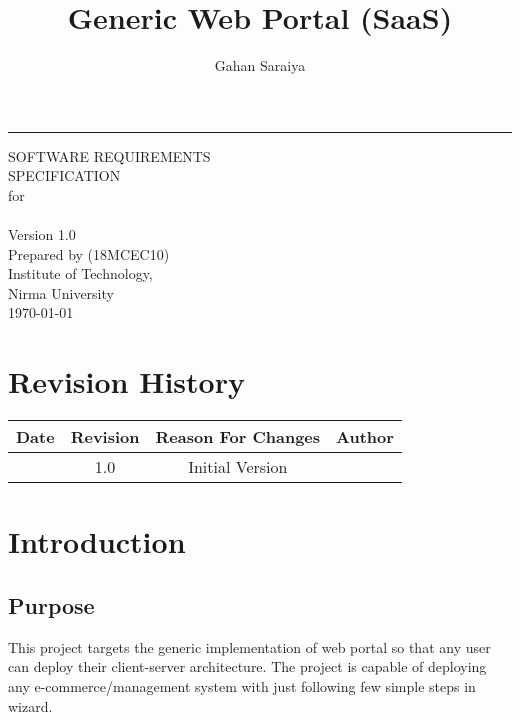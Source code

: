 \documentclass{report}
\date{}
\title{Generic Web Portal (SaaS)}
\author{Gahan Saraiya}
\def\myversion{1.0 }
\def\university{Institute of Technology, \\Nirma University}
\begin{document}
\begin{flushright}
    \rule{16cm}{5pt}\vskip1cm
    \begin{bfseries}
        \Huge{SOFTWARE REQUIREMENTS\\ SPECIFICATION}\\
        for\\
        \vspace{1.9cm}
        \thetitle\\
        \vspace{1.9cm}
        \LARGE{Version \myversion}\\
        \vspace{1.9cm}
        Prepared by \theauthor (18MCEC10)\\
        \vspace{1.9cm}
        \university\\
        \vspace{1.9cm}
        \today\\
    \end{bfseries}
\end{flushright}

\tableofcontents  %
\listoffigures  %

\chapter*{Revision History}
\begin{center}
    \begin{tabular}{|c|c|c|c|}
        \hline
	    Date & Revision & Reason For Changes & Author \\
        \hline
	     & 1.0 & Initial Version & \theauthor\\
        \hline
    \end{tabular}
\end{center}

\chapter{Introduction}
\label{introduction}

\section{Purpose}
\label{purpose}
This project targets the generic implementation of web portal so that any user can deploy their client-server architecture.
The project is capable of deploying any e-commerce/management system with just following few simple steps in wizard.
\end{document}
